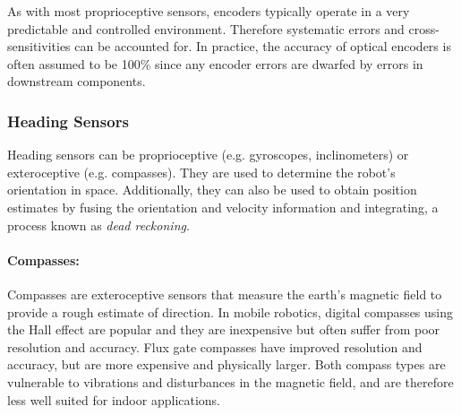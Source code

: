 As with most proprioceptive sensors, encoders typically operate in a very predictable and controlled environment. Therefore systematic errors and cross-sensitivities can be accounted for. In practice, the accuracy of optical encoders is often assumed to be 100\% since any encoder errors are dwarfed by errors in downstream components.

\subsubsection{Heading Sensors}
Heading sensors can be proprioceptive (e.g. gyroscopes, inclinometers) or exteroceptive (e.g. compasses). They are used to determine the robot’s orientation in space. Additionally, they can also be used to obtain position estimates by fusing the orientation and velocity information and integrating, a process known as \textit{dead reckoning}.

\paragraph{Compasses:} Compasses are exteroceptive sensors that measure the earth's magnetic field to provide a rough estimate of direction. In mobile robotics, digital compasses using the Hall effect are popular and they are inexpensive but often suffer from poor resolution and accuracy. Flux gate compasses have improved resolution and accuracy, but are more expensive and physically larger. Both compass types are vulnerable to vibrations and disturbances in the magnetic field, and are therefore less well suited for indoor applications.

